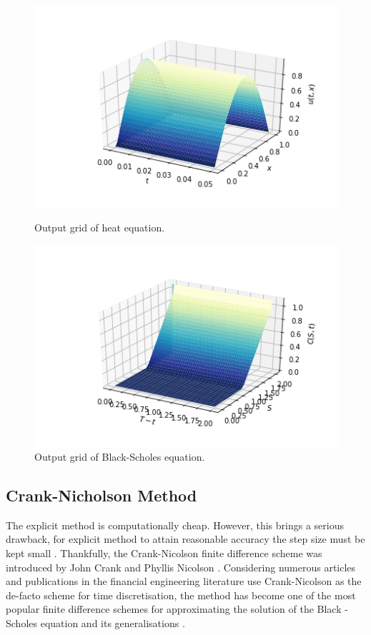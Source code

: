 \documentclass[12pt, oneside]{book}
\theoremstyle{plain}
\theoremstyle{definition}
\begin{document}
\begin{figure}[!htb]
  \begin{minipage}[b]{0.5\textwidth}
    \includegraphics[width=\textwidth]{HeatExplicitGrid.png}
    \caption{Output grid of heat equation.}
  \end{minipage}
  \begin{minipage}[b]{0.5\textwidth}
    \includegraphics[width=\textwidth]{BSExplicitGrid.png}
    \caption{Output grid of Black-Scholes equation.}
  \end{minipage}
\end{figure}

\subsection{Crank-Nicholson Method}
The explicit method is computationally cheap. However, this brings a serious drawback, for explicit method to attain reasonable accuracy the step size must be kept small \cite{gdsmith}. Thankfully, the Crank-Nicolson finite difference scheme was introduced by John Crank and Phyllis Nicolson \cite{cn}. Considering numerous articles and publications in the financial engineering literature use Crank-Nicolson as the de-facto scheme for time discretisation, the method has become one of the most popular finite difference schemes for approximating the solution of the Black - Scholes equation and its generalisations \cite{tavella}.
\end{document}
